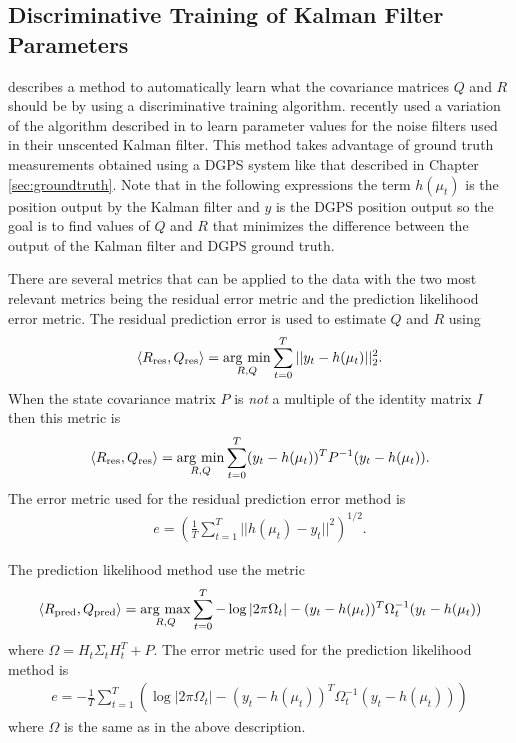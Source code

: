 \subsection{Discriminative Training of Kalman Filter Parameters}
\label{sec:kftrainingparams}
\cite{Abbeel-RSS-05} describes a method to automatically learn what the covariance matrices $Q$ and $R$ should be by using a discriminative training algorithm. \cite{SakaiKuroda10} recently used a variation of the algorithm described in \cite{Abbeel-RSS-05} to learn parameter values for the noise filters used in their unscented Kalman filter. This method takes advantage of ground truth measurements obtained using a DGPS system like that described in Chapter \ref{sec:groundtruth}. Note that in the following expressions the term $h(\mu_t)$ is the position output by the Kalman filter and $y$ is the DGPS position output so the goal is to find values of $Q$ and $R$ that minimizes the difference between the output of the Kalman filter and DGPS ground truth.

There are several metrics that can be applied to the data with the two most relevant metrics being the residual error metric and the prediction likelihood error metric. The residual prediction error is used to estimate $Q$ and $R$ using
\begin{align*}
\left<R_{\text{res}},Q_{\text{res}}\right> = \mathop{\arg\,\min}\limits_{R,Q}\sum_{t=0}^T ||y_t-h(\mu_t)||_2^2.
\end{align*}
When the state covariance matrix $P$ is \textit{not} a multiple of the identity matrix $I$ then this metric is
\begin{align*}
\left<R_{\text{res}},Q_{\text{res}}\right> = \mathop{\arg\,\min}\limits_{R,Q}\sum_{t=0}^T (y_t-h(\mu_t))^TP^{-1}(y_t-h(\mu_t)).
\end{align*}
The error metric used for the residual prediction error method is
\begin{align}
\label{eq:kftrainingres}
e = \left(\frac{1}{T}\sum_{t=1}^T ||h(\mu_t)-y_t||^2\right)^{1/2}.
\end{align}

The prediction likelihood method use the metric
\begin{align*}
\left<R_{\text{pred}},Q_{\text{pred}}\right> = \mathop{\arg\,\max}\limits_{R,Q}\sum_{t=0}^T -\log|2\pi\Omega_t| - (y_t-h(\mu_t))^T\Omega_t^{-1}(y_t-h(\mu_t))
\end{align*}
where $\Omega = H_t\Sigma_tH_t^T+P$. The error metric used for the prediction likelihood method is
\begin{align}
\label{eq:kftrainingpred}
e = -\frac{1}{T}\sum_{t=1}^T \left(\log|2\pi\Omega_t| - (y_t-h(\mu_t))^T\Omega_t^{-1}(y_t-h(\mu_t))\right)
\end{align}
where $\Omega$ is the same as in the above description.

